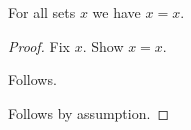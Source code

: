 \begin{proposition}\label{phase5_fixed_set_induction}
    For all sets $x$ we have $x=x$.
\end{proposition}
\begin{proof}
    Fix $x$.
    Show $x=x$.
    \begin{subproof}
        Follows.
    \end{subproof}
    Follows by assumption.
\end{proof}
